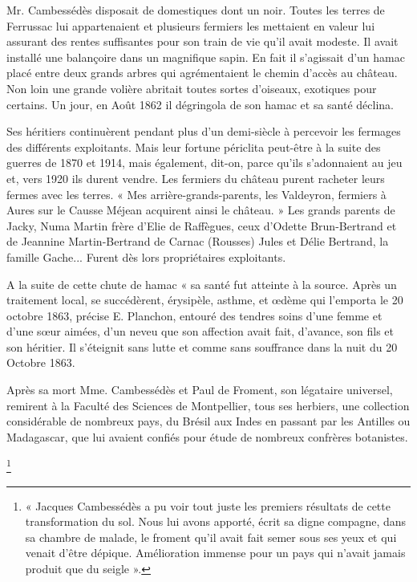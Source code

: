 \begin{tcolorbox}
Mr. Cambessédès disposait de domestiques dont un noir. Toutes les terres de Ferrussac lui appartenaient et
plusieurs fermiers les mettaient en valeur lui assurant des rentes suffisantes pour son train de vie qu’il avait
modeste. Il avait installé une balançoire dans un magnifique sapin. En fait il s’agissait d’un hamac placé entre
deux grands arbres qui agrémentaient le chemin d’accès au château. Non loin une grande volière abritait
toutes sortes d’oiseaux, exotiques pour certains. Un jour, en Août 1862 il dégringola de son hamac et sa santé
déclina.

Ses héritiers continuèrent pendant plus d’un demi-siècle à percevoir les fermages des différents exploitants. Mais
leur fortune périclita peut-être à la suite des guerres de 1870 et 1914, mais également, dit-on, parce qu’ils
s’adonnaient au jeu et, vers 1920 ils durent vendre.
Les fermiers du château purent racheter leurs fermes avec les terres.
« Mes arrière-grands-parents, les Valdeyron, fermiers à Aures sur le Causse Méjean acquirent ainsi le château. »
Les grands parents de Jacky, Numa Martin frère d’Elie de Raffègues, ceux d’Odette Brun-Bertrand et de
Jeannine Martin-Bertrand de Carnac (Rousses) Jules et Délie Bertrand, la famille Gache... Furent dès lors
propriétaires exploitants.
\end{tcolorbox}

A la suite de cette chute de hamac « sa santé fut atteinte à la source. Après un traitement
local, se succédèrent, érysipèle, asthme, et œdème qui l’emporta le 20 octobre 1863, précise
E. Planchon, entouré des tendres soins d’une femme et d’une sœur aimées, d’un neveu que
son affection avait fait, d’avance, son fils et son héritier. Il s’éteignit sans lutte et comme sans
souffrance dans la nuit du 20 Octobre 1863.

Après sa mort Mme. Cambessédès et Paul de Froment, son légataire universel, remirent à la
Faculté des Sciences de Montpellier, tous ses herbiers, une collection considérable de
nombreux pays, du Brésil aux Indes en passant par les Antilles ou Madagascar, que lui
avaient confiés pour étude de nombreux confrères botanistes.

\footnote{« Jacques Cambessédès a pu voir tout juste les premiers résultats de cette transformation du sol. Nous lui
avons apporté, écrit sa digne compagne, dans sa chambre de malade, le froment qu’il avait fait semer sous ses
yeux et qui venait d’être dépique. Amélioration immense pour un pays qui n’avait jamais produit que du seigle ».}


